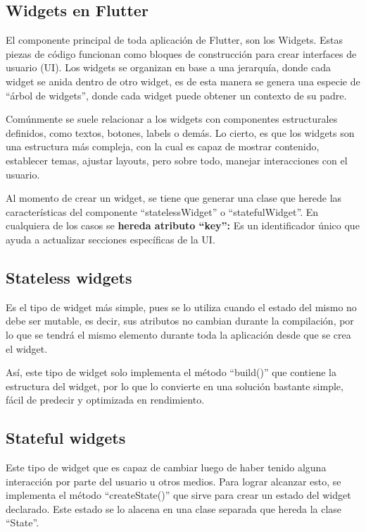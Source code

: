 \subsection{Widgets en Flutter}
El componente principal de toda aplicación de Flutter, son los Widgets. Estas piezas de código funcionan como bloques de construcción para crear interfaces de usuario (UI). Los widgets se organizan en base a una jerarquía, donde cada widget se anida dentro de otro widget, es de esta manera se genera una especie de “árbol de widgets”, donde cada widget puede obtener un contexto de su padre. \parencite{FlutterDocs2025}

Comúnmente se suele relacionar a los widgets con componentes estructurales definidos, como textos, botones, labels o demás. Lo cierto, es que los widgets son una estructura más compleja, con la cual es capaz de mostrar contenido, establecer temas, ajustar layouts, pero sobre todo, manejar interacciones con el usuario. \parencite{Gill2025}

Al momento de crear un widget, se tiene que generar una clase que herede las características del componente “statelessWidget” o “statefulWidget”. En cualquiera de los casos se \textbf{hereda atributo “key”:} Es un identificador único que ayuda a actualizar secciones específicas de la UI.

\subsection{Stateless widgets}
Es el tipo de widget más simple, pues se lo utiliza cuando el estado del mismo no debe ser mutable, es decir, sus atributos no cambian durante la compilación, por lo que se tendrá el mismo elemento durante toda la aplicación desde que se crea el widget.

Así, este tipo de widget solo implementa el método “build()” que contiene la estructura del widget, por lo que lo convierte en una solución bastante simple, fácil de predecir y optimizada en rendimiento. \parencite{Tllez2024}


\subsection{Stateful widgets}
Este tipo de widget que es capaz de cambiar luego de haber tenido alguna interacción por parte del usuario u otros medios. Para lograr alcanzar esto, se implementa el método “createState()” que sirve para crear un estado del widget declarado. Este estado se lo alacena en una clase separada que hereda la clase “State”. \parencite{Nwogu2023}

